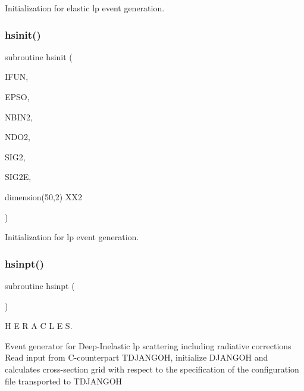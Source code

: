 Initialization for elastic lp event generation. 

\mbox{\label{djangoh__h_8f_afa43b203c023b0f6b66302ebcdb277f9}} 
\subsubsection{\texorpdfstring{hsinit()}{hsinit()}}
{\footnotesize\ttfamily subroutine hsinit (\begin{DoxyParamCaption}\item[{}]{I\+F\+UN,  }\item[{}]{E\+P\+SO,  }\item[{}]{N\+B\+I\+N2,  }\item[{}]{N\+D\+O2,  }\item[{}]{S\+I\+G2,  }\item[{}]{S\+I\+G2E,  }\item[{dimension(50,2)}]{X\+X2 }\end{DoxyParamCaption})}



Initialization for lp event generation. 

\mbox{\label{djangoh__h_8f_aeed46fd210a75e927cb5503e28be7285}} 
\subsubsection{\texorpdfstring{hsinpt()}{hsinpt()}}
{\footnotesize\ttfamily subroutine hsinpt (\begin{DoxyParamCaption}{ }\end{DoxyParamCaption})}



H E R A C L E S. 

Event generator for Deep-\/\+Inelastic lp scattering including radiative corrections Read input from C-\/counterpart T\+D\+J\+A\+N\+G\+OH, initialize D\+J\+A\+N\+G\+OH and calculates cross-\/section grid with respect to the specification of the configuration file transported to T\+D\+J\+A\+N\+G\+OH \mbox{\label{djangoh__h_8f_a243cf7ba8798a80242e649f4a13e10ad}} 
